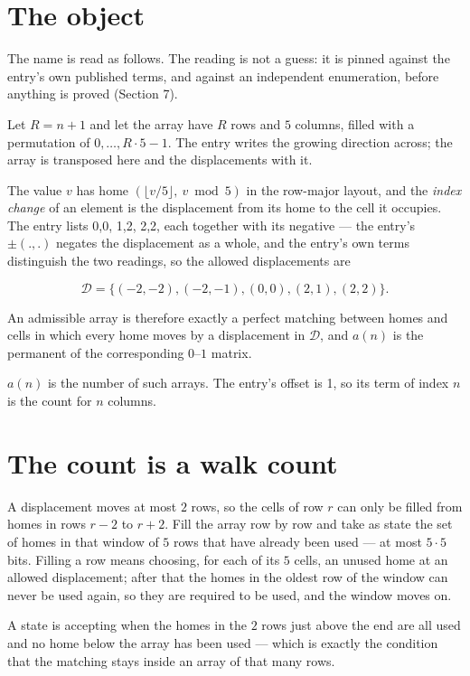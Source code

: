 \documentclass[11pt]{article}
\theoremstyle{definition}
\begin{document}
\section{The object}

The name is read as follows. The reading is not a guess: it is pinned against the entry's own published terms, and against an independent enumeration, before anything is proved (Section 7).

Let $R = n + 1$ and let the array have $R$ rows and $5$ columns, filled with a permutation of $0,\dots,R\cdot5-1$. The entry writes the growing direction across; the array is transposed here and the displacements with it.

The value $v$ has home $(\lfloor v/5\rfloor,\ v \bmod 5)$ in the row-major layout, and the {\itshape index change} of an element is the displacement from its home to the cell it occupies. The entry lists 0,0, 1,2, 2,2, each together with its negative --- the entry's $\pm(.,.)$ negates the displacement as a whole, and the entry's own terms distinguish the two readings, so the allowed displacements are

\[\mathcal{D} = \{(-2,-2), (-2,-1), (0,0), (2,1), (2,2)\}.\]

An admissible array is therefore exactly a perfect matching between homes and cells in which every home moves by a displacement in $\mathcal{D}$, and $a(n)$ is the permanent of the corresponding $0$--$1$ matrix.

$a(n)$ is the number of such arrays. The entry's offset is 1, so its term of index $n$ is the count for $n$ columns.

\section{The count is a walk count}

A displacement moves at most $2$ rows, so the cells of row $r$ can only be filled from homes in rows $r-2$ to $r+2$. Fill the array row by row and take as state the set of homes in that window of $5$ rows that have already been used --- at most $5\cdot5$ bits. Filling a row means choosing, for each of its $5$ cells, an unused home at an allowed displacement; after that the homes in the oldest row of the window can never be used again, so they are required to be used, and the window moves on.

A state is accepting when the homes in the $2$ rows just above the end are all used and no home below the array has been used --- which is exactly the condition that the matching stays inside an array of that many rows.
\end{document}
